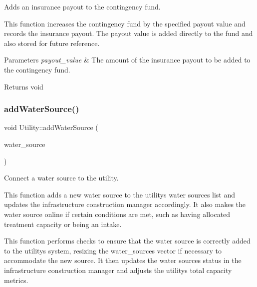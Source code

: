 Adds an insurance payout to the contingency fund. 

This function increases the contingency fund by the specified payout value and records the insurance payout. The payout value is added directly to the fund and also stored for future reference.


\begin{DoxyParams}{Parameters}
{\em payout\+\_\+value} & The amount of the insurance payout to be added to the contingency fund.\\
\hline
\end{DoxyParams}
\begin{DoxyReturn}{Returns}
void 
\end{DoxyReturn}
\mbox{\label{classUtility_aebbfd65c13e86cfeda8bdfbcc6712587}} 
\subsubsection{\texorpdfstring{add\+Water\+Source()}{addWaterSource()}}
{\footnotesize\ttfamily void Utility\+::add\+Water\+Source (\begin{DoxyParamCaption}\item[{\mbox{\hyperlink{classWaterSource}{Water\+Source}} $\ast$}]{water\+\_\+source }\end{DoxyParamCaption})}



Connect a water source to the utility. 

This function adds a new water source to the utility\textquotesingle{}s water sources list and updates the infrastructure construction manager accordingly. It also makes the water source online if certain conditions are met, such as having allocated treatment capacity or being an intake.

This function performs checks to ensure that the water source is correctly added to the utility\textquotesingle{}s system, resizing the water\+\_\+sources vector if necessary to accommodate the new source. It then updates the water source\textquotesingle{}s status in the infrastructure construction manager and adjusts the utility\textquotesingle{}s total capacity metrics.


